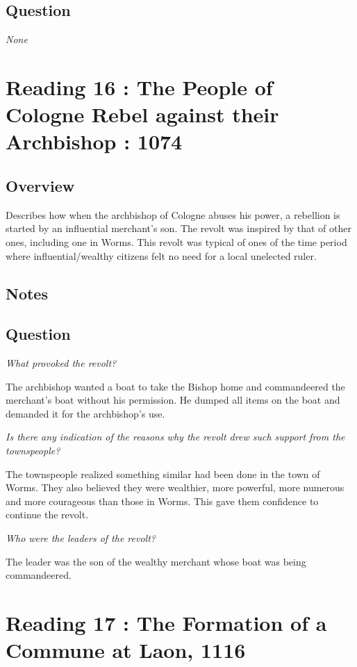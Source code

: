\documentclass[12pt]{article}
\begin{document}
\subsection*{Question}
	\textit{None}
	
\section*{Reading 16 : The People of Cologne Rebel against their Archbishop : 1074}

\subsection*{Overview}

Describes how when the archbishop of Cologne abuses his power, a rebellion is started by an influential merchant's son. The revolt was inspired by that of other ones, including one in Worms. This revolt was typical of ones of the time period where influential/wealthy citizens felt no need for a local  unelected ruler.

\subsection*{Notes}

\subsection*{Question}

\textit{What provoked the revolt?}

The archbishop wanted a boat to take the Bishop home and commandeered the merchant's boat without his permission. He dumped all items on the boat and demanded it for the archbishop's use.

\textit{Is there any indication of the reasons why the revolt drew such support from the townspeople?}

The townspeople realized something similar had been done in the town of Worms. They also believed they were wealthier, more powerful, more numerous and more courageous than those in Worms. This gave them confidence to continue the revolt.

\textit{Who were the leaders of the revolt?}

The leader was the son of the wealthy merchant whose boat was being commandeered.

\section*{Reading 17 : The Formation of a Commune at Laon, 1116}
\end{document}
